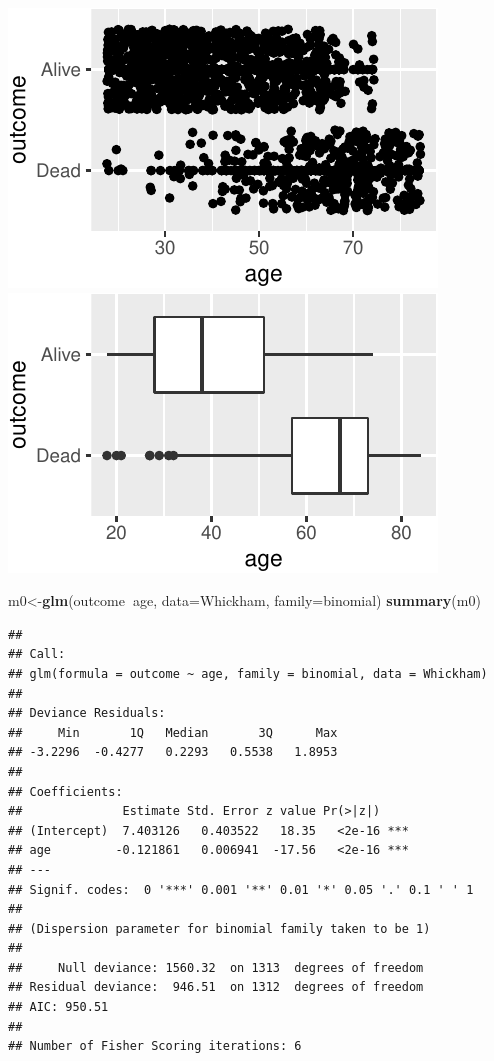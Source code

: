\documentclass[]{article}
\newenvironment{Shaded}{\begin{snugshade}}{\end{snugshade}}
\newcommand{\DataTypeTok}[1]{\textcolor[rgb]{0.13,0.29,0.53}{#1}}
\newcommand{\KeywordTok}[1]{\textcolor[rgb]{0.13,0.29,0.53}{\textbf{#1}}}
\newcommand{\NormalTok}[1]{#1}
\newcommand{\OperatorTok}[1]{\textcolor[rgb]{0.81,0.36,0.00}{\textbf{#1}}}
\begin{document}
\includegraphics{20-inclasslab-answers_files/figure-latex/unnamed-chunk-3-1.pdf}
\includegraphics{20-inclasslab-answers_files/figure-latex/unnamed-chunk-3-2.pdf}

\begin{Shaded}
\begin{Highlighting}[]
\NormalTok{m0<-}\KeywordTok{glm}\NormalTok{(outcome}\OperatorTok{~}\NormalTok{age, }\DataTypeTok{data=}\NormalTok{Whickham, }\DataTypeTok{family=}\NormalTok{binomial)}
\KeywordTok{summary}\NormalTok{(m0)}
\end{Highlighting}
\end{Shaded}

\begin{verbatim}
## 
## Call:
## glm(formula = outcome ~ age, family = binomial, data = Whickham)
## 
## Deviance Residuals: 
##     Min       1Q   Median       3Q      Max  
## -3.2296  -0.4277   0.2293   0.5538   1.8953  
## 
## Coefficients:
##              Estimate Std. Error z value Pr(>|z|)    
## (Intercept)  7.403126   0.403522   18.35   <2e-16 ***
## age         -0.121861   0.006941  -17.56   <2e-16 ***
## ---
## Signif. codes:  0 '***' 0.001 '**' 0.01 '*' 0.05 '.' 0.1 ' ' 1
## 
## (Dispersion parameter for binomial family taken to be 1)
## 
##     Null deviance: 1560.32  on 1313  degrees of freedom
## Residual deviance:  946.51  on 1312  degrees of freedom
## AIC: 950.51
## 
## Number of Fisher Scoring iterations: 6
\end{verbatim}
\end{document}
